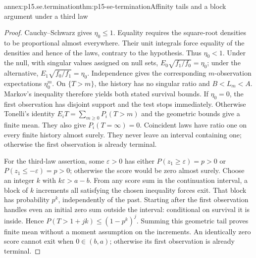 \begin{annexitem}{annex:p15.se.termination}{thm:p15-se-termination}{Affinity tails and a block argument under a third law}
\begin{proof}
Cauchy--Schwarz gives \(\eta_0\leq1\). Equality requires the
square-root densities to be proportional almost everywhere. Their unit
integrals force equality of the densities and hence of the laws, contrary
to the hypothesis. Thus \(\eta_0<1\). Under the null, with singular
values assigned on null sets,
\(E_0\sqrt{f_1/f_0}=\eta_0\); under the alternative,
\(E_1\sqrt{f_0/f_1}=\eta_0\). Independence gives the corresponding
\(m\)-observation expectations \(\eta_0^m\). On \(\{T>m\}\),
the history has no singular ratio and \(B<L_m<A\). Markov's inequality
therefore yields both stated survival bounds. If \(\eta_0=0\),
the first observation has disjoint support and the test stops immediately.
Otherwise Tonelli's identity
\(E_iT=\sum_{m\geq0}P_i(T>m)\) and the geometric bounds give a finite
mean. They also give \(P_i(T=\infty)=0\). Coincident laws have ratio
one on every finite history almost surely. They never leave an interval
containing one; otherwise the first observation is already terminal.

For the third-law assertion, some \(\varepsilon>0\) has either
\(P(z_1\geq\varepsilon)=p>0\) or
\(P(z_1\leq-\varepsilon)=p>0\); otherwise the score would be zero
almost surely. Choose an integer \(k\) with
\(k\varepsilon>a-b\). From any score sum in the continuation interval,
a block of \(k\) increments all satisfying the chosen inequality
forces exit. That block has probability \(p^k\), independently of
the past. Starting after the first observation handles even an initial
zero sum outside the interval: conditional on survival it is inside.
Hence \(P(T>1+jk)\leq(1-p^k)^j\). Summing this geometric
tail proves finite mean without a moment assumption on the increments.
An identically zero score cannot exit when \(0\in(b,a)\);
otherwise its first observation is already terminal.
\end{proof}
\end{annexitem}


